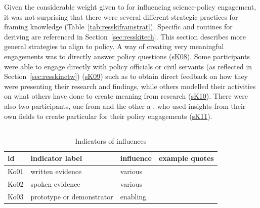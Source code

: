 Given the considerable weight given to \skifram{} for influencing science-policy engagement, it was not surprising that there were several different strategic practices for framing knowledge (Table~\ref{tab:resskiframstrat}). Specific \skitech{} and routines for deriving \skifram{} are referenced in Section~\ref{sec:resskitech}. This section describes more general strategies to align \skifram{} to policy. A way of creating very meaningful engagements was to directly answer policy questions (\hyperref[tab:resskiframstrat]{sK08}). Some participants were able to engage directly with policy officials or civil servants (as reflected in Section~\ref{sec:resskinetw}) (\hyperref[tab:resskiframstrat]{sK09}) such as to obtain direct feedback on how they were presenting their research and findings, while others modelled their activities on what others have done to create meaning from research (\hyperref[tab:resskiframstrat]{sK10}). There were also two participants, one from  and the other a , who used insights from their own fields to create particular \skifram{} for their policy engagements (\hyperref[tab:resskiframstrat]{sK11}). 

\subsection{\titobje}\label{sec:resskiobje}

\begin{table}[!ht]
\footnotesize
\caption{Indicators of \skiobje{} influences}\label{tab:resskiobje}
\begin{tabular}{L{.07\linewidth}L{.3\linewidth}L{.11\linewidth}L{.52\linewidth}} \hline
\textbf{id} & \textbf{indicator label} & \textbf{influence} & \textbf{example quotes} \\ \hline \hline 
Ko01 & written evidence & various &  \\
Ko02 & spoken evidence & various &  \\
Ko03 & prototype or demonstrator & enabling &  \\
\hline
\end{tabular}
\end{table}

